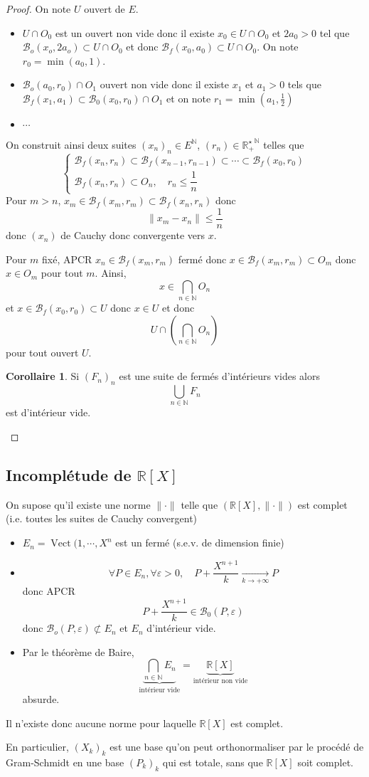 \documentclass{article}
\theoremstyle{definition}
\newtheorem*{cor}{Corollaire}
\DeclareMathOperator{\Vect}{Vect}
\begin{document}
\begin{proof}
On note $U$ ouvert de $E$.
\begin{itemize}
    \item 
$U\cap O_0$ est un ouvert non vide donc il existe $x_0\in U\cap O_0$ et $2a_0>0$ tel que $\mathcal B_o(x_o, 2a_o)\subset U\cap O_0$ et donc $\mathcal B_f(x_0, a_0)\subset U\cap O_0$. On note $r_0=\min(a_0, 1)$.
\item $\mathcal B_o(a_0, r_0)\cap O_1$ ouvert non vide donc il existe $x_1$ et $a_1>0$ tels que $\mathcal B_f(x_1, a_1)\subset \mathcal B_0(x_0, r_0)\cap O_1$ et on note $r_1=\min\left(a_1, \frac12\right)$

\item $\cdots$
\end{itemize}
On construit ainsi deux suites $(x_n)_n\in E^{\mathbb N}$, $(r_n)\in\mathbb {R_+^\star}^{\mathbb N}$ telles que \[
    \begin{cases}
        \mathcal B_f(x_n, r_n)\subset \mathcal B_f(x_{n-1}, r_{n-1})\subset \cdots \subset \mathcal B_f(x_0, r_0) \\
        \mathcal B_f(x_n, r_n)\subset O_n, \quad r_n\leq \dfrac 1n
    \end{cases}
\]
Pour $m>n$, $x_m\in\mathcal B_f(x_m, r_m)\subset\mathcal B_f(x_n, r_n)$ donc \[
    \|x_m-x_n\|\leq \frac 1n
\]
donc $(x_n)$ de Cauchy donc convergente vers $x$.

Pour $m$ fixé, APCR $x_n\in\mathcal B_f(x_m, r_m)$ fermé donc $x\in\mathcal B_f(x_m, r_m)\subset O_m$ donc $x\in O_m$ pour tout $m$. Ainsi, \[
    x\in\bigcap_{n\in\mathbb N}O_n
\]
et $x\in\mathcal B_f(x_0, r_0)\subset U$ donc $x\in U$ et donc \[
    U\cap\left(\bigcap_{n\in\mathbb N}O_n\right)
\]
pour tout ouvert $U$.

\begin{cor}
Si $(F_n)_n$ est une suite de fermés d'intérieurs vides alors \[
    \bigcup_{n\in\mathbb N}F_n
\] est d'intérieur vide.
\end{cor}
\end{proof}

\subsection{Incomplétude de $\mathbb R[X]$}

On supose qu'il existe une norme $\|\cdot \|$ telle que $(\mathbb R[X], \|\cdot \|)$ est complet (i.e. toutes les suites de Cauchy convergent)

\begin{itemize}
    \item $E_n=\Vect(1, \cdots, X^n$ est un fermé (s.e.v. de dimension finie)
    \item \[
    \forall P\in E_n, \forall \varepsilon>0, \quad P+\frac{X^{n+1}}k\xrightarrow[k\to+\infty]{} P
    \] donc APCR \[
        P+\frac{X^{n+1}}k \in \mathcal B_0(P, \varepsilon)
    \]
    donc $\mathcal B_o(P, \varepsilon)\not\subset E_n$ et $E_n$ d'intérieur vide.
    \item Par le théorème de Baire, \[
        \underbrace{\bigcap_{n\in\mathbb N} E_n}_{\text{intérieur vide}}=\underbrace{\mathbb R[X]}_{\text{intérieur non vide}}
    \]
    absurde.
\end{itemize}

Il n'existe donc aucune norme pour laquelle $\mathbb R[X]$ est complet.

En particulier, $(X_k)_k$ est une base qu'on peut orthonormaliser par le procédé de Gram-Schmidt en une base $(P_k)_k$ qui est totale, sans que $\mathbb R[X]$ soit complet.
\end{document}
